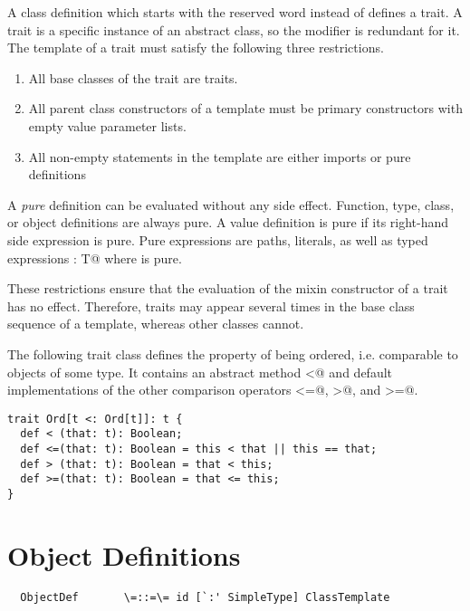 \documentclass[11pt]{report}
\begin{document}
A class definition which starts with the reserved word \verb@trait@
instead of \verb@class@ defines a trait. A trait is a specific
instance of an abstract class, so the \verb@abstract@ modifier is
redundant for it.  The template of a trait must satisfy the following
three restrictions.
\begin{enumerate}
\item All base classes of the trait are traits.
\item All parent class constructors of a template
      must be primary constructors with empty value
      parameter lists. 
\item All non-empty statements in the template are either imports or pure definitions
\end{enumerate}
A {\em pure} definition can be evaluated without any side effect.
Function, type, class, or object definitions are always pure. A value
definition is pure if its right-hand side expression is pure. Pure
expressions are paths, literals, as well as typed expressions
\verb@e: T@ where \verb@e@ is pure.

These restrictions ensure that the evaluation of the mixin constructor
of a trait has no effect. Therefore, traits may appear several times 
in the base class sequence of a template, whereas other classes cannot.

\example\label{ex:comparable}
The following trait class defines the property of being
ordered, i.e. comparable to objects of some type. It contains an abstract method
\verb@<@ and default implementations of the other comparison operators
\verb@<=@, \verb@>@, and \verb@>=@.

\begin{verbatim}
trait Ord[t <: Ord[t]]: t {
  def < (that: t): Boolean;
  def <=(that: t): Boolean = this < that || this == that;
  def > (that: t): Boolean = that < this;
  def >=(that: t): Boolean = that <= this;
}
\end{verbatim}

\section{Object Definitions}
\label{sec:modules}
\label{sec:object-defs}

\syntax\begin{verbatim}
  ObjectDef       \=::=\= id [`:' SimpleType] ClassTemplate
\end{verbatim}
\end{document}
